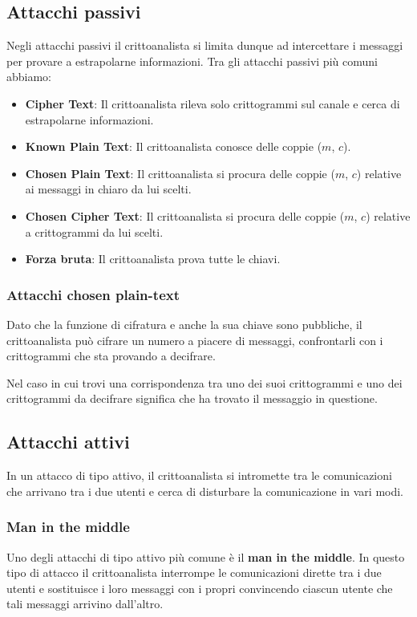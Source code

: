 \subsection{Attacchi passivi}
Negli attacchi passivi il crittoanalista si limita dunque ad intercettare i messaggi per provare a estrapolarne
informazioni. Tra gli attacchi passivi pi\`u comuni abbiamo:
\begin{itemize}
	\item \textbf{Cipher Text}: Il crittoanalista rileva solo crittogrammi sul canale e cerca di estrapolarne informazioni.
	\item \textbf{Known Plain Text}: Il crittoanalista conosce delle coppie ($m$, $c$).
	\item \textbf{Chosen Plain Text}: Il crittoanalista si procura delle coppie ($m$, $c$) relative
	      ai messaggi in chiaro da lui scelti.
	\item \textbf{Chosen Cipher Text}: Il crittoanalista si procura delle coppie ($m$, $c$) relative a crittogrammi
	      da lui scelti.
	\item \textbf{Forza bruta}: Il crittoanalista prova tutte le chiavi.
\end{itemize}

\subsubsection{Attacchi chosen plain-text}
Dato che la funzione di cifratura e anche la sua chiave sono pubbliche, il crittoanalista pu\`o cifrare un numero a
piacere di messaggi, confrontarli con i crittogrammi che sta provando a decifrare.

Nel caso in cui trovi una corrispondenza tra uno dei suoi crittogrammi e uno dei crittogrammi da decifrare significa
che ha trovato il messaggio in questione.

\subsection{Attacchi attivi}
In un attacco di tipo attivo, il crittoanalista si intromette tra le comunicazioni che arrivano tra i due utenti e
cerca di disturbare la comunicazione in vari modi.

\subsubsection{Man in the middle}
Uno degli attacchi di tipo attivo pi\`u comune \`e il \textbf{man in the middle}. In questo tipo di attacco il
crittoanalista interrompe le comunicazioni dirette tra i due utenti e sostituisce i loro messaggi con i propri
convincendo ciascun utente che tali messaggi arrivino dall'altro.